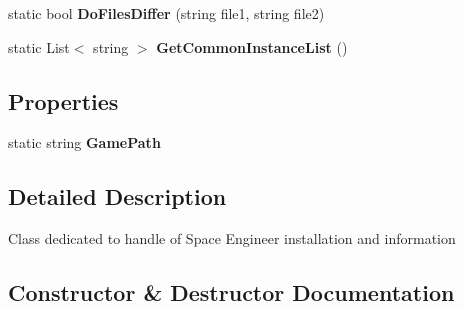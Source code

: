 \begin{DoxyCompactItemize}
\item 
\hypertarget{class_s_e_mod_a_p_i_1_1_a_p_i_1_1_game_installation_info_a59f1084465c9f825ebc0a1239ab8eb54}{}static bool {\bfseries Do\+Files\+Differ} (string file1, string file2)\label{class_s_e_mod_a_p_i_1_1_a_p_i_1_1_game_installation_info_a59f1084465c9f825ebc0a1239ab8eb54}

\item 
\hypertarget{class_s_e_mod_a_p_i_1_1_a_p_i_1_1_game_installation_info_a3dddc53f7dbd09662a5362d3b9975a22}{}static List$<$ string $>$ {\bfseries Get\+Common\+Instance\+List} ()\label{class_s_e_mod_a_p_i_1_1_a_p_i_1_1_game_installation_info_a3dddc53f7dbd09662a5362d3b9975a22}

\end{DoxyCompactItemize}
\subsection*{Properties}
\begin{DoxyCompactItemize}
\item 
\hypertarget{class_s_e_mod_a_p_i_1_1_a_p_i_1_1_game_installation_info_ad1f4f61fe5bf8ac8308274ac4b9cc425}{}static string {\bfseries Game\+Path}\label{class_s_e_mod_a_p_i_1_1_a_p_i_1_1_game_installation_info_ad1f4f61fe5bf8ac8308274ac4b9cc425}

\end{DoxyCompactItemize}


\subsection{Detailed Description}
Class dedicated to handle of Space Engineer installation and information 



\subsection{Constructor \& Destructor Documentation}
\hypertarget{class_s_e_mod_a_p_i_1_1_a_p_i_1_1_game_installation_info_a2195754adbfb91bbed507b0d0bf69970}{}
